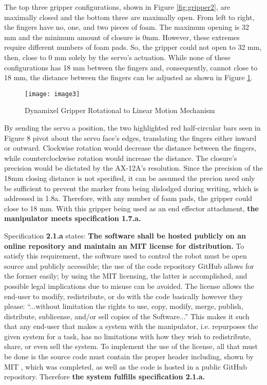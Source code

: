 The top three gripper configurations, shown in Figure \ref{fig:gripper2}, are maximally closed and the bottom three are maximally open.  From left to right, the fingers have no, one, and two pieces of foam. The maximum opening is 32 mm and the minimum amount of closure is 0mm. However, these extremes require different numbers of foam pads. So, the gripper could not open to 32 mm, then, close to 0 mm solely by the servo’s actuation. While none of these configurations has 18 mm between the fingers and, consequently, cannot close to 18 mm, the distance between the fingers can be adjusted as shown in Figure \ref{fig:gripper3}.

\begin{figure}[htp]
  \centering
  \texttt{[image: image3]}
  \caption{Dynamixel Gripper Rotational to Linear Motion Mechanism \cite{gripper2}}
  \label{fig:gripper3}
\end{figure}

By sending the servo a position, the two highlighted red half-circular bars seen in Figure 8 pivot about the servo face’s edges, translating the fingers either inward or outward. Clockwise rotation would decrease the distance between the fingers, while counterclockwise rotation would increase the distance. The closure’s precision would be dictated by the AX-12A’s resolution. Since the precision of the 18mm closing distance is not specified, it can be assumed the precion need only be sufficient to prevent the marker from being dislodged during writing, which is addressed in 1.8a. Therefore, with any number of foam pads, the gripper could close to 18 mm. With this gripper being used as an end effector attachment, \textbf{the manipulator meets specification 1.7.a.}

Specification \textbf{2.1.a} states: \textbf{The software shall be hosted publicly on an online repository and maintain an MIT license for distribution.} To satisfy this requirement, the software used to control the robot must be open source and publicly accessible; the use of the code repository GitHub allows for the former easily; by using the MIT licensing, the latter is accomplished, and possible legal implications due to misuse can be avoided. The license allows the end-user to modify, redistribute, or do with the code basically however they please: “...without limitation the rights to use, copy, modify, merge, publish, distribute, sublicense, and/or sell copies of the Software...”\cite{mit} This makes it such that any end-user that makes a system with the manipulator, i.e. repurposes the given system for a task, has no limitations with how they wish to redistribute, share, or even sell the system. To implement the use of the license, all that must be done is the source code must contain the proper header including, shown by MIT \cite{mit}, which was completed, as well as the code is hosted in a public GitHub repository. Therefore \textbf{the system fulfills specification 2.1.a.}


